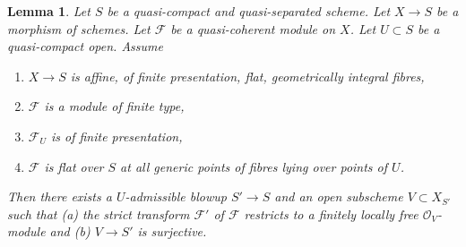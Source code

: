 \documentclass{amsart}
\theoremstyle{plain}
\newtheorem{lemma}[subsection]{Lemma}
\theoremstyle{definition}
\theoremstyle{remark}
\numberwithin{equation}{subsection}
\begin{document}
\begin{lemma}
\label{lemma-flatten-module-pre}
Let $S$ be a quasi-compact and quasi-separated scheme.
Let $X \to S$ be a morphism of schemes.
Let $\mathcal{F}$ be a quasi-coherent module on $X$.
Let $U \subset S$ be a quasi-compact open. Assume
\begin{enumerate}
\item $X \to S$ is affine, of finite presentation, flat,
geometrically integral fibres,
\item $\mathcal{F}$ is a module of finite type,
\item $\mathcal{F}_U$ is of finite presentation,
\item $\mathcal{F}$ is flat over $S$ at all generic points of
fibres lying over points of $U$.
\end{enumerate}
Then there exists a $U$-admissible blowup $S' \to S$
and an open subscheme $V \subset X_{S'}$
such that (a) the strict transform $\mathcal{F}'$ of $\mathcal{F}$
restricts to a finitely locally free $\mathcal{O}_V$-module and
(b) $V \to S'$ is surjective.
\end{lemma}
\end{document}

